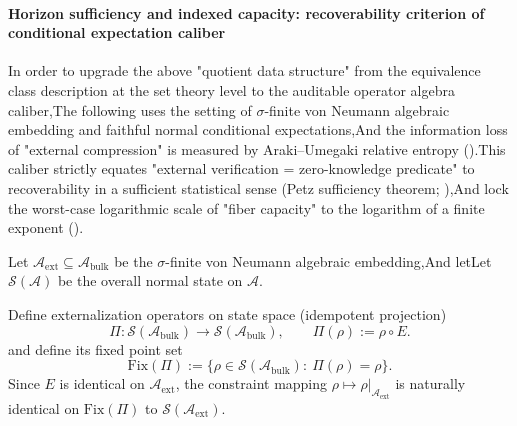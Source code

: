 \paragraph{Horizon sufficiency and indexed capacity: recoverability criterion of conditional expectation caliber}In order to upgrade the above "quotient data structure" from the equivalence class description at the set theory level to the auditable operator algebra caliber,The following uses the setting of \(\sigma\)-finite von Neumann algebraic embedding and faithful normal conditional expectations,And the information loss of "external compression" is measured by Araki--Umegaki relative entropy (\cite{Araki1976RelativeEntropyVonNeumann}).This caliber strictly equates "external verification = zero-knowledge predicate" to recoverability in a sufficient statistical sense (Petz sufficiency theorem; \cite{Petz1986SufficientSubalgebrasRelativeEntropy,Petz2003MonotonicityRelativeEntropyRevisited}),And lock the worst-case logarithmic scale of "fiber capacity" to the logarithm of a finite exponent (\cite{PimsnerPopa1986EntropyIndexSubfactors,Hiai1991MinimumIndexSubfactorsEntropyII}).
\begin{definition}\label{def:dephys-conditional-expectation-externalization-map}Let \(\mathcal{A}_{\mathrm{ext}}\subseteq \mathcal{A}_{\mathrm{bulk}}\) be the \(\sigma\)-finite von Neumann algebraic embedding,And letLet \(\mathcal{S}(\mathcal{A})\) be the overall normal state on \(\mathcal{A}\).\par
Define externalization operators on state space (idempotent projection)\begin{equation}\label{eq:dephys-ext-externalization-Pi}
\boxed{\;
\Pi:\mathcal{S}(\mathcal{A}_{\mathrm{bulk}})\to \mathcal{S}(\mathcal{A}_{\mathrm{bulk}}),
\qquad
\Pi(\rho):=\rho\circ E.\;}
\end{equation}
and define its fixed point set\[
\mathrm{Fix}(\Pi):=\{\rho\in\mathcal{S}(\mathcal{A}_{\mathrm{bulk}}):\ \Pi(\rho)=\rho\}.
\]
Since \(E\) is identical on \(\mathcal{A}_{\mathrm{ext}}\), the constraint mapping \(\rho\mapsto \rho|_{\mathcal{A}_{\mathrm{ext}}}\) is naturally identical on \(\mathrm{Fix}(\Pi)\) to \(\mathcal{S}(\mathcal{A}_{\mathrm{ext}})\).\end{definition}

